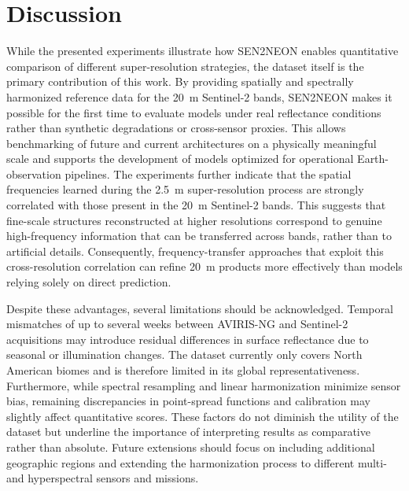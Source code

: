 \documentclass[journal]{IEEEtran}
\begin{document}

\section{Discussion}
While the presented experiments illustrate how SEN2NEON enables quantitative comparison of different super-resolution strategies, the dataset itself is the primary contribution of this work. By providing spatially and spectrally harmonized reference data for the \SI{20}{m} Sentinel-2 bands, SEN2NEON makes it possible for the first time to evaluate models under real reflectance conditions rather than synthetic degradations or cross-sensor proxies. This allows benchmarking of future and current architectures on a physically meaningful scale and supports the development of models optimized for operational Earth-observation pipelines. The experiments further indicate that the spatial frequencies learned during the \SI{2.5}{m} super-resolution process are strongly correlated with those present in the \SI{20}{m} Sentinel-2 bands. This suggests that fine-scale structures reconstructed at higher resolutions correspond to genuine high-frequency information that can be transferred across bands, rather than to artificial details. Consequently, frequency-transfer approaches that exploit this cross-resolution correlation can refine \SI{20}{m} products more effectively than models relying solely on direct prediction.

Despite these advantages, several limitations should be acknowledged. Temporal mismatches of up to several weeks between AVIRIS-NG and Sentinel-2 acquisitions may introduce residual differences in surface reflectance due to seasonal or illumination changes. The dataset currently only covers North American biomes and is therefore limited in its global representativeness. Furthermore, while spectral resampling and linear harmonization minimize sensor bias, remaining discrepancies in point-spread functions and calibration may slightly affect quantitative scores. These factors do not diminish the utility of the dataset but underline the importance of interpreting results as comparative rather than absolute. Future extensions should focus on including additional geographic regions and extending the harmonization process to different multi- and hyperspectral sensors and missions.
\end{document}
